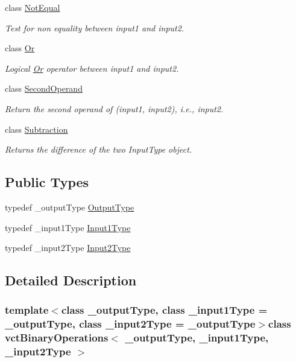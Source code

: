 \begin{DoxyCompactItemize}
class \hyperlink{classvct_binary_operations_1_1_not_equal}{Not\-Equal}
\begin{DoxyCompactList}\small\item\em Test for non equality between input1 and input2. \end{DoxyCompactList}\item 
class \hyperlink{classvct_binary_operations_1_1_or}{Or}
\begin{DoxyCompactList}\small\item\em Logical \hyperlink{classvct_binary_operations_1_1_or}{Or} operator between input1 and input2. \end{DoxyCompactList}\item 
class \hyperlink{classvct_binary_operations_1_1_second_operand}{Second\-Operand}
\begin{DoxyCompactList}\small\item\em Return the second operand of (input1, input2), i.\-e., input2. \end{DoxyCompactList}\item 
class \hyperlink{classvct_binary_operations_1_1_subtraction}{Subtraction}
\begin{DoxyCompactList}\small\item\em Returns the difference of the two Input\-Type object. \end{DoxyCompactList}\end{DoxyCompactItemize}
\subsection*{Public Types}
\begin{DoxyCompactItemize}
\item 
typedef \-\_\-output\-Type \hyperlink{classvct_binary_operations_afbfa2d453460e6ab5b67c26e2d3fc4b1}{Output\-Type}
\item 
typedef \-\_\-input1\-Type \hyperlink{classvct_binary_operations_a5e56a66a012d6a28c539a08a0021c45e}{Input1\-Type}
\item 
typedef \-\_\-input2\-Type \hyperlink{classvct_binary_operations_a929119af557a04a16b4d854981e49e1b}{Input2\-Type}
\end{DoxyCompactItemize}


\subsection{Detailed Description}
\subsubsection*{template$<$class \-\_\-output\-Type, class \-\_\-input1\-Type = \-\_\-output\-Type, class \-\_\-input2\-Type = \-\_\-output\-Type$>$class vct\-Binary\-Operations$<$ \-\_\-output\-Type, \-\_\-input1\-Type, \-\_\-input2\-Type $>$}

